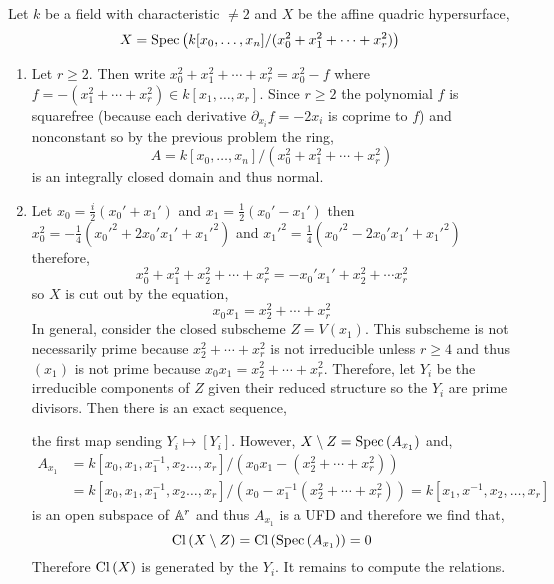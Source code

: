 \documentclass[12pt]{article}
\begin{document}
Let $k$ be a field with characteristic $\neq 2$ and $X$ be the affine quadric hypersurface,
\[ X = \mathrm{Spec}\left( k[x_0, \dots, x_n]/(x_0^2 + x_1^2 + \cdots + x_r^2) \right) \]
\begin{enumerate}
\item Let $r \ge 2$. Then write $x_0^2 + x_1^2 + \cdots + x_r^2 = x_0^2 - f$ where $f = -(x_1^2 + \cdots + x_r^2) \in k[x_1, \dots, x_r]$. Since $r \ge 2$ the polynomial $f$ is squarefree (because each derivative $\partial_{x_i} f = - 2 x_i$ is coprime to $f$) and nonconstant so by the previous problem the ring,
\[ A = k[x_0, \dots, x_n]/(x_0^2 + x_1^2 + \cdots + x_r^2) \]
is an integrally closed domain and thus normal.

\item Let $x_0 = \tfrac{i}{2}(x_0' + x_1')$ and $x_1 = \tfrac{1}{2}(x_0' - x_1')$ then $x_0^2 = - \tfrac{1}{4}( x_0'^2 + 2 x_0' x_1' + x_1'^2 )$ and $x_1'^2 = \tfrac{1}{4} (x_0'^2 - 2 x_0' x_1' + x_1'^2)$ therefore,
\[ x_0^2 + x_1^2 + x_2^2 + \cdots + x_r^2 = - x_0' x_1' + x_2^2 + \cdots x_r^2 \]
so $X$ is cut out by the equation,
\[ x_0 x_1 = x_2^2 + \cdots + x_r^2 \]
In general, consider the closed subscheme $Z = V(x_1)$. This subscheme is not necessarily prime because $x_2^2 + \cdots + x_r^2$ is not irreducible unless $r \ge 4$ and thus $(x_1)$ is not prime because $x_0 x_1 = x_2^2 + \cdots + x_r^2$. Therefore, let $Y_i$ be the irreducible components of $Z$ given their reduced structure so the $Y_i$ are prime divisors. Then there is an exact sequence,
\begin{center}
\end{center}
the first map sending $Y_i \mapsto [Y_i]$. However, $X \setminus Z = \mathrm{Spec}\left( A_{x_1} \right)$ and,
\begin{align*}
A_{x_1} & = k[x_0, x_1, x_1^{-1}, x_2 \dots, x_r]/(x_0 x_1 - (x_2^2 + \cdots + x_r^2)) 
\\
& = k[x_0, x_1, x_1^{-1}, x_2 \dots, x_r]/(x_0 - x_1^{-1} (x_2^2 + \cdots + x_r^2)) = k[x_1, x^{-1}, x_2, \dots, x_r] 
\end{align*}
is an open subspace of $\mathbb{A}^r$ and thus $A_{x_1}$ is a UFD and therefore we find that,
\[ \mathrm{Cl} \left( X \setminus Z \right) = \mathrm{Cl} \left( \mathrm{Spec}\left( A_{x_1} \right) \right) = 0 \]
Therefore $\mathrm{Cl} \left( X \right)$ is generated by the $Y_i$. It remains to compute the relations.
\bigskip\\

\end{enumerate}
\end{document}

